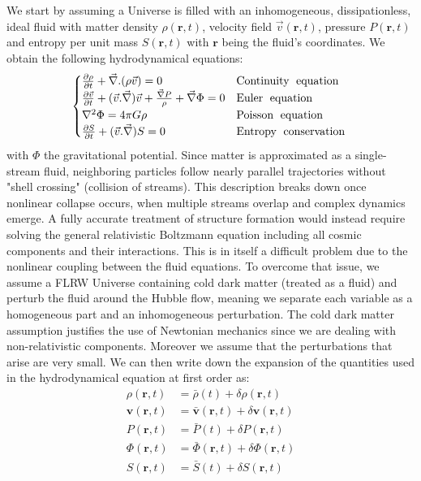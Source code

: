 We start by assuming a Universe is filled with an inhomogeneous, dissipationless, ideal fluid with matter density $\rho(\mathbf{r},t)$, velocity field $\vec{v}(\mathbf{r}, t)$, 
pressure $P(\mathbf{r},t)$ and entropy per unit mass $S(\mathbf{r}, t)$ with $\mathbf{r}$ being the fluid's coordinates. We obtain the following hydrodynamical equations:
\begin{equation}
    \begin{cases}
        \frac{\partial \rho}{\partial t} + \vec{\nabla}. (\rho \vec{v}) = 0 & \text{Continuity\; equation\;} \\
        \frac{\partial \vec{v}}{\partial t} + (\vec{v} . \vec{\nabla}) \vec{v} + \frac{\vec{\nabla} P }{\rho} + \vec{\nabla}\Phi = 0 & \text{Euler\; equation\;} \\
        \nabla^2 \Phi = 4 \pi G \rho & \text{Poisson\; equation\;} \\
        \frac{\partial S}{\partial t } + (\vec{v} . \vec{\nabla}) S = 0& \text{Entropy\; conservation\;}
    \end{cases}
    \label{eqn:hydro_eqn}
\end{equation}
with $\Phi$ the gravitational potential. Since matter is approximated as a single-stream fluid, 
neighboring particles follow nearly parallel trajectories without "shell crossing" (collision of streams). This description breaks down once nonlinear collapse occurs, 
when multiple streams overlap and complex dynamics emerge. A fully accurate treatment of structure formation would instead 
require solving the general relativistic Boltzmann equation including all cosmic components and their interactions. This is in itself a difficult problem due to the nonlinear 
coupling between the fluid equations. To overcome that issue, we assume a FLRW Universe containing cold dark matter (treated as a fluid) and perturb the fluid around the 
Hubble flow, meaning we separate each variable as a homogeneous part and an inhomogeneous perturbation. The cold dark matter assumption justifies the use of Newtonian mechanics 
since we are dealing with non-relativistic components. Moreover we assume that the perturbations that arise are very small. We can then write down 
the expansion of the quantities used in the hydrodynamical equation at first order as:
\begin{align*} 
    \rho(\mathbf{r},t) &=  \bar{\rho}(t) + \delta \rho(\mathbf{r},t) \\ 
    \mathbf{v}(\mathbf{r},t) &=  \bar{\mathbf{v}}(\mathbf{r},t) + \delta \mathbf{v}(\mathbf{r},t) \\
    P(\mathbf{r},t) &=  \bar{P}(t) + \delta P(\mathbf{r},t) \\
    \Phi(\mathbf{r},t) &=  \bar{\Phi}(\mathbf{r},t) + \delta \Phi(\mathbf{r},t) \\
    S(\mathbf{r},t) &=  \bar{S}(t) + \delta S(\mathbf{r},t) \\
\end{align*}

